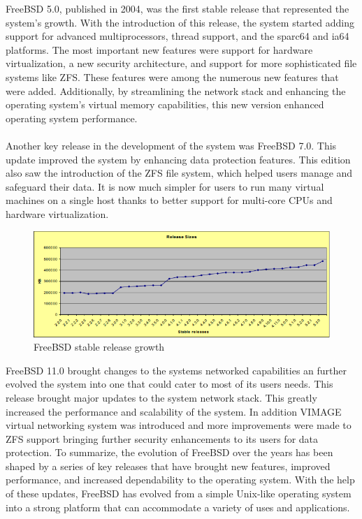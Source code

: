 \documentclass[12pt, dvipsnames, a4paper]{article}
\begin{document}
FreeBSD 5.0, published in 2004, was the first stable release that represented the system's growth. With the introduction of this release, the system started adding support for advanced multiprocessors, thread support, and the sparc64 and ia64 platforms. The most important new features were support for hardware virtualization, a new security architecture, and support for more sophisticated file systems like ZFS. These features were among the numerous new features that were added. Additionally, by streamlining the network stack and enhancing the operating system's virtual memory capabilities, this new version enhanced operating system performance.\\\\
Another key release in the development of the system was FreeBSD 7.0. This update improved the system by enhancing data protection features. This edition also saw the introduction of the ZFS file system, which helped users manage and safeguard their data. It is now much simpler for users to run many virtual machines on a single host thanks to better support for multi-core CPUs and hardware virtualization.\\
\begin{figure}[h]
	\center
	\includegraphics[width=350pt]{assets/release_graph.png}
	\caption{FreeBSD stable release growth \cite{Bieman}}
\end{figure}

FreeBSD 11.0 brought changes to the systems networked capabilities an further evolved the system into one that could cater to most of its users needs. This release brought major updates to the system network stack. This greatly increased the performance and scalability of the system. In addition VIMAGE virtual networking system was introduced and more improvements were made to ZFS support bringing further security enhancements to its users for data protection.
To summarize, the evolution of FreeBSD over the years has been shaped by a series of key releases that have brought new features, improved performance, and increased dependability to the operating system. With the help of these updates, FreeBSD has evolved from a simple Unix-like operating system into a strong platform that can accommodate a variety of uses and applications.
\end{document}
